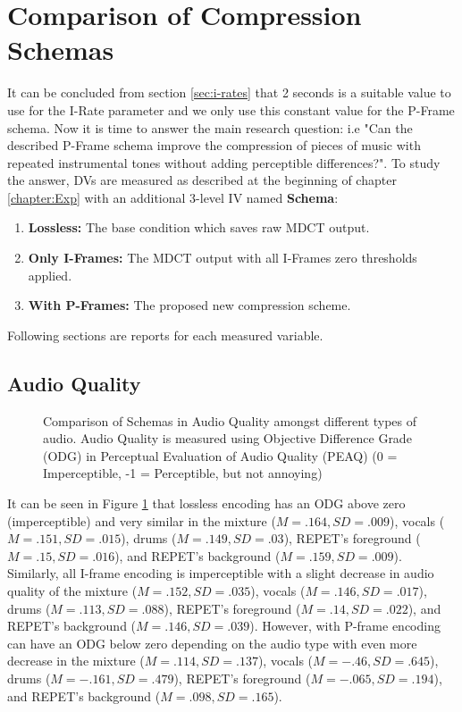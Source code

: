 \section{Comparison of Compression Schemas}
\label{sec:pframe-exp}

It can be concluded from section \ref{sec:i-rates} that 2 seconds is a suitable value to use for the I-Rate parameter and we only use this constant value for the P-Frame schema. Now it is time to answer the main research question: i.e "Can the described P-Frame schema improve the compression of pieces of music with repeated instrumental tones without adding perceptible differences?". To study the answer, DVs are measured as described at the beginning of chapter \ref{chapter:Exp} with an additional 3-level IV named \textbf{Schema}:

\begin{enumerate}
\item\textbf{Lossless:} The base condition which saves raw MDCT output.
\item\textbf{Only I-Frames:} The MDCT output with all I-Frames zero thresholds applied.
\item\textbf{With P-Frames:} The proposed new compression scheme.
\end{enumerate}

\noindent Following sections are reports for each measured variable.

\subsection{Audio Quality}

\begin{figure}[ht]
  
  \caption[Comparison of Schemas in Audio Quality amongst different types of audio]{Comparison of Schemas in Audio Quality amongst different types of audio. Audio Quality is measured using Objective Difference Grade (ODG) in Perceptual Evaluation of Audio Quality (PEAQ) (0 = Imperceptible, -1 = Perceptible, but not annoying)}
  \label{fig:input-peaq}
\end{figure}

It can be seen in Figure \ref{fig:input-peaq} that lossless encoding has an ODG above zero (imperceptible) and very similar in the mixture ($M=.164, SD=.009$), vocals ($M=.151, SD=.015$), drums ($M=.149, SD=.03$), REPET's foreground ($M=.15, SD=.016$), and REPET's background ($M=.159, SD=.009$). 
Similarly, all I-frame encoding is imperceptible with a slight decrease in audio quality of the mixture ($M=.152, SD=.035$), vocals ($M=.146, SD=.017$), drums ($M=.113, SD=.088$), REPET's foreground ($M=.14, SD=.022$), and REPET's background ($M=.146, SD=.039$). 
However, with P-frame encoding can have an ODG below zero depending on the audio type with even more decrease in the mixture ($M=.114, SD=.137$), vocals ($M=-.46, SD=.645$), drums ($M=-.161, SD=.479$), REPET's foreground ($M=-.065, SD=.194$), and REPET's background ($M=.098, SD=.165$). 

